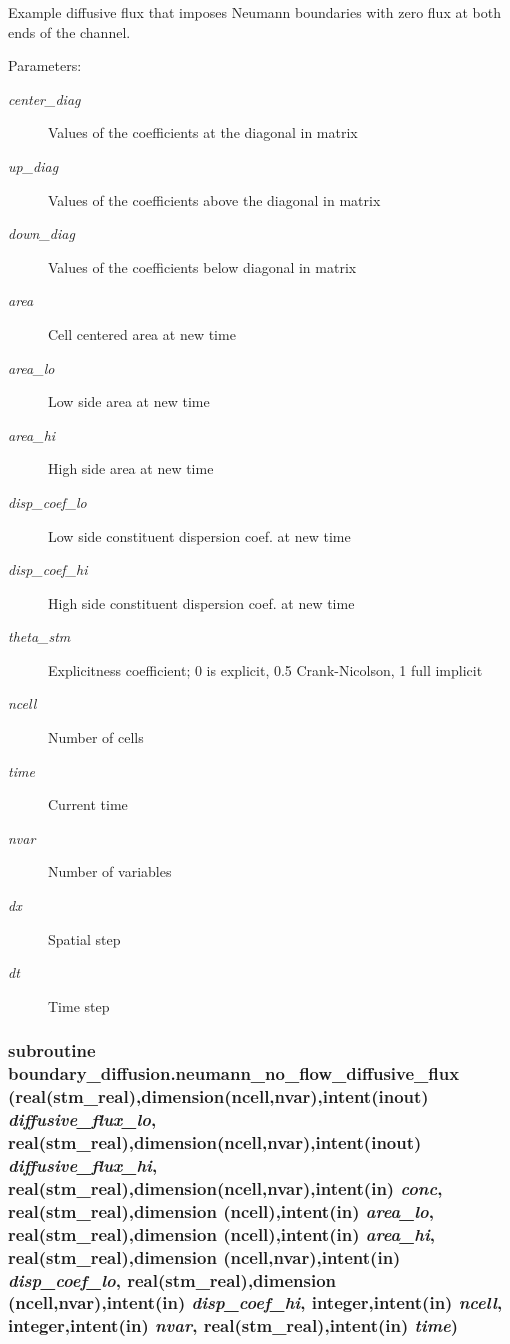 \label{a00051_35936f4856e0472bc61d1deef432ff3e}


Example diffusive flux that imposes Neumann boundaries with zero flux at both ends of the channel. 

\begin{Desc}
\item[Parameters:]
\begin{description}
\item[{\em center\_\-diag}]Values of the coefficients at the diagonal in matrix\item[{\em up\_\-diag}]Values of the coefficients above the diagonal in matrix\item[{\em down\_\-diag}]Values of the coefficients below diagonal in matrix\item[{\em area}]Cell centered area at new time \item[{\em area\_\-lo}]Low side area at new time\item[{\em area\_\-hi}]High side area at new time \item[{\em disp\_\-coef\_\-lo}]Low side constituent dispersion coef. at new time\item[{\em disp\_\-coef\_\-hi}]High side constituent dispersion coef. at new time\item[{\em theta\_\-stm}]Explicitness coefficient; 0 is explicit, 0.5 Crank-Nicolson, 1 full implicit \item[{\em ncell}]Number of cells\item[{\em time}]Current time\item[{\em nvar}]Number of variables\item[{\em dx}]Spatial step \item[{\em dt}]Time step \end{description}
\end{Desc}
\hypertarget{a00051_1e0b364f397107a8d87850fedede417a}{
\subsubsection[{neumann\_\-no\_\-flow\_\-diffusive\_\-flux}]{\setlength{\rightskip}{0pt plus 5cm}subroutine boundary\_\-diffusion.neumann\_\-no\_\-flow\_\-diffusive\_\-flux (real(stm\_\-real),dimension(ncell,nvar),intent(inout) {\em diffusive\_\-flux\_\-lo}, \/  real(stm\_\-real),dimension(ncell,nvar),intent(inout) {\em diffusive\_\-flux\_\-hi}, \/  real(stm\_\-real),dimension(ncell,nvar),intent(in) {\em conc}, \/  real(stm\_\-real),dimension         (ncell),intent(in) {\em area\_\-lo}, \/  real(stm\_\-real),dimension         (ncell),intent(in) {\em area\_\-hi}, \/  real(stm\_\-real),dimension (ncell,nvar),intent(in) {\em disp\_\-coef\_\-lo}, \/  real(stm\_\-real),dimension (ncell,nvar),intent(in) {\em disp\_\-coef\_\-hi}, \/  integer,intent(in) {\em ncell}, \/  integer,intent(in) {\em nvar}, \/  real(stm\_\-real),intent(in) {\em time})}}
\label{a00051_1e0b364f397107a8d87850fedede417a}


